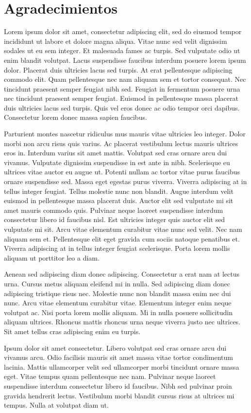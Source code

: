 \section*{Agradecimientos}
Lorem ipsum dolor sit amet, consectetur adipiscing elit, sed do eiusmod tempor incididunt ut labore et dolore magna aliqua. Vitae nunc sed velit dignissim sodales ut eu sem integer. Et malesuada fames ac turpis. Sed vulputate odio ut enim blandit volutpat. Lacus suspendisse faucibus interdum posuere lorem ipsum dolor. Placerat duis ultricies lacus sed turpis. At erat pellentesque adipiscing commodo elit. Quam pellentesque nec nam aliquam sem et tortor consequat. Nec tincidunt praesent semper feugiat nibh sed. Feugiat in fermentum posuere urna nec tincidunt praesent semper feugiat. Euismod in pellentesque massa placerat duis ultricies lacus sed turpis. Quis vel eros donec ac odio tempor orci dapibus. Consectetur lorem donec massa sapien faucibus.

Parturient montes nascetur ridiculus mus mauris vitae ultricies leo integer. Dolor morbi non arcu risus quis varius. Ac placerat vestibulum lectus mauris ultrices eros in. Interdum varius sit amet mattis. Volutpat sed cras ornare arcu dui vivamus. Vulputate dignissim suspendisse in est ante in nibh. Scelerisque eu ultrices vitae auctor eu augue ut. Potenti nullam ac tortor vitae purus faucibus ornare suspendisse sed. Massa eget egestas purus viverra. Viverra adipiscing at in tellus integer feugiat. Tellus molestie nunc non blandit. Augue interdum velit euismod in pellentesque massa placerat duis. Auctor elit sed vulputate mi sit amet mauris commodo quis. Pulvinar neque laoreet suspendisse interdum consectetur libero id faucibus nisl. Est ultricies integer quis auctor elit sed vulputate mi sit. Arcu vitae elementum curabitur vitae nunc sed velit. Nec nam aliquam sem et. Pellentesque elit eget gravida cum sociis natoque penatibus et. Viverra adipiscing at in tellus integer feugiat scelerisque. Porta lorem mollis aliquam ut porttitor leo a diam.

Aenean sed adipiscing diam donec adipiscing. Consectetur a erat nam at lectus urna. Cursus metus aliquam eleifend mi in nulla. Sed adipiscing diam donec adipiscing tristique risus nec. Molestie nunc non blandit massa enim nec dui nunc. Arcu vitae elementum curabitur vitae. Elementum integer enim neque volutpat ac. Nisi porta lorem mollis aliquam. Mi in nulla posuere sollicitudin aliquam ultrices. Rhoncus mattis rhoncus urna neque viverra justo nec ultrices. Sit amet tellus cras adipiscing enim eu turpis.

Ipsum dolor sit amet consectetur. Libero volutpat sed cras ornare arcu dui vivamus arcu. Odio facilisis mauris sit amet massa vitae tortor condimentum lacinia. Mattis ullamcorper velit sed ullamcorper morbi tincidunt ornare massa eget. Vitae tempus quam pellentesque nec nam. Pulvinar neque laoreet suspendisse interdum consectetur libero id faucibus. Nibh sed pulvinar proin gravida hendrerit lectus. Vestibulum morbi blandit cursus risus at ultrices mi tempus. Nulla at volutpat diam ut. 